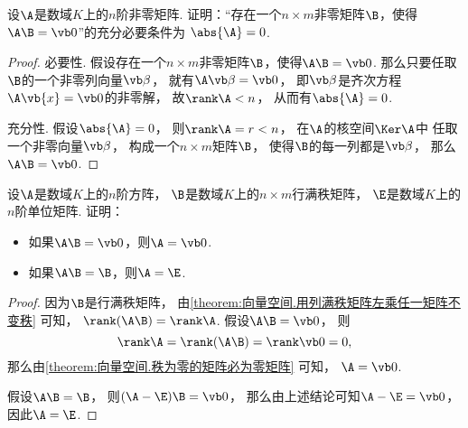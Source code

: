 \begin{example}
设\(\A\)是数域\(K\)上的\(n\)阶非零矩阵.
证明：“存在一个\(n \times m\)非零矩阵\(\B\)，使得\(\A\B=\vb0\)”的充分必要条件为
\(\abs{\A}=0\).
\begin{proof}
必要性.
假设存在一个\(n \times m\)非零矩阵\(\B\)，使得\(\A\B=\vb0\).
那么只要任取\(\B\)的一个非零列向量\(\vb\beta\)，
就有\(\A\vb\beta = \vb0\)，
即\(\vb\beta\)是齐次方程\(\A\vb{x}=\vb0\)的非零解，
故\(\rank\A<n\)，
从而有\(\abs{\A}=0\).

充分性.
假设\(\abs{\A}=0\)，
则\(\rank\A = r < n\)，
在\(\A\)的核空间\(\Ker\A\)中
任取一个非零向量\(\vb\beta\)，
构成一个\(n \times m\)矩阵\(\B\)，
使得\(\B\)的每一列都是\(\vb\beta\)，
那么\(\A\B=\vb0\).
\end{proof}
\end{example}
\begin{example}
设\(\A\)是数域\(K\)上的\(n\)阶方阵，
\(\B\)是数域\(K\)上的\(n \times m\)行满秩矩阵，
\(\E\)是数域\(K\)上的\(n\)阶单位矩阵.
证明：\begin{itemize}
	\item 如果\(\A\B=\vb0\)，则\(\A=\vb0\).
	\item 如果\(\A\B=\B\)，则\(\A=\E\).
\end{itemize}
\begin{proof}
因为\(\B\)是行满秩矩阵，
由\cref{theorem:向量空间.用列满秩矩阵左乘任一矩阵不变秩} 可知，
\(\rank(\A\B) = \rank\A\).
假设\(\A\B=\vb0\)，
则\[
	\rank\A=\rank(\A\B)=\rank\vb0=0,
\]
那么由\cref{theorem:向量空间.秩为零的矩阵必为零矩阵} 可知，
\(\A=\vb0\).

假设\(\A\B=\B\)，
则\((\A-\E)\B=\vb0\)，
那么由上述结论可知\(\A-\E=\vb0\)，
因此\(\A=\E\).
\end{proof}
\end{example}

